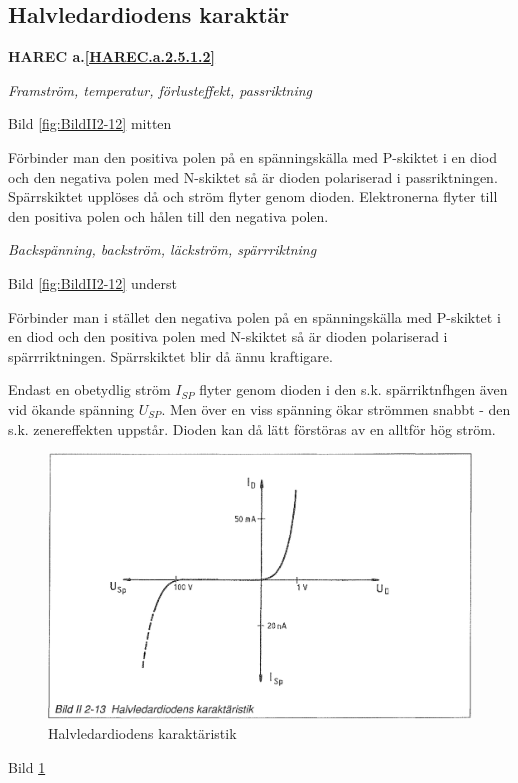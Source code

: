 \subsection{Halvledardiodens karaktär}
\textbf{HAREC a.\ref{HAREC.a.2.5.1.2}\label{myHAREC.a.2.5.1.2}}

\emph{Framström, temperatur, förlusteffekt, passriktning}

Bild \ref{fig:BildII2-12} mitten

Förbinder man den positiva polen på en spänningskälla med P-skiktet i en diod
och den negativa polen med N-skiktet så är dioden polariserad i passriktningen.
Spärrskiktet upplöses då och ström flyter genom dioden. Elektronerna flyter till
den positiva polen och hålen till den negativa polen.

\emph{Backspänning, backström, läckström, spärrriktning}

Bild \ref{fig:BildII2-12} underst

Förbinder man i stället den negativa polen på en spänningskälla med P-skiktet i
en diod och den positiva polen med N-skiktet så är dioden polariserad i
spärrriktningen. Spärrskiktet blir då ännu kraftigare.

Endast en obetydlig ström \(I_{SP}\) flyter genom dioden i den s.k.
spärriktnfhgen även vid ökande spänning \(U_{SP}\). Men över en viss spänning
ökar strömmen snabbt - den s.k. zenereffekten uppstår. Dioden kan då lätt
förstöras av en alltför hög ström.

\begin{figure}
\includegraphics[width=\textwidth]{images/bild_2_2-13}
\caption{Halvledardiodens karaktäristik}
\label{fig:BildII2-13}
\end{figure}

Bild \ref{fig:BildII2-13}

